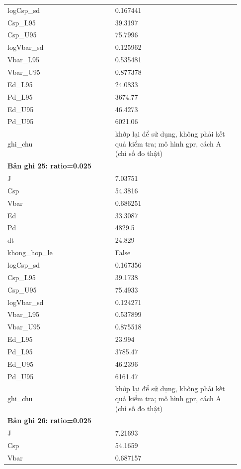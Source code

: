 \begin{longtable}{p{0.43\linewidth}p{0.50\linewidth}}
logCsp\_\allowbreak sd & 0.167441 \\
Csp\_\allowbreak L95 & 39.3197 \\
Csp\_\allowbreak U95 & 75.7996 \\
logVbar\_\allowbreak sd & 0.125962 \\
Vbar\_\allowbreak L95 & 0.535481 \\
Vbar\_\allowbreak U95 & 0.877378 \\
Ed\_\allowbreak L95 & 24.0833 \\
Pd\_\allowbreak L95 & 3674.77 \\
Ed\_\allowbreak U95 & 46.4273 \\
Pd\_\allowbreak U95 & 6021.06 \\
ghi\_\allowbreak chu & khớp lại để sử dụng, không phải kết quả kiểm tra; mô hình gpr, cách A (chỉ số đo thật) \\
\midrule
\multicolumn{2}{p{0.95\linewidth}}{\textbf{Bản ghi 25: ratio=0.025}} \\
J & 7.03751 \\
Csp & 54.3816 \\
Vbar & 0.686251 \\
Ed & 33.3087 \\
Pd & 4829.5 \\
dt & 24.829 \\
khong\_\allowbreak hop\_\allowbreak le & False \\
logCsp\_\allowbreak sd & 0.167356 \\
Csp\_\allowbreak L95 & 39.1738 \\
Csp\_\allowbreak U95 & 75.4933 \\
logVbar\_\allowbreak sd & 0.124271 \\
Vbar\_\allowbreak L95 & 0.537899 \\
Vbar\_\allowbreak U95 & 0.875518 \\
Ed\_\allowbreak L95 & 23.994 \\
Pd\_\allowbreak L95 & 3785.47 \\
Ed\_\allowbreak U95 & 46.2396 \\
Pd\_\allowbreak U95 & 6161.47 \\
ghi\_\allowbreak chu & khớp lại để sử dụng, không phải kết quả kiểm tra; mô hình gpr, cách A (chỉ số đo thật) \\
\midrule
\multicolumn{2}{p{0.95\linewidth}}{\textbf{Bản ghi 26: ratio=0.025}} \\
J & 7.21693 \\
Csp & 54.1659 \\
Vbar & 0.687157 \\

\end{longtable}
